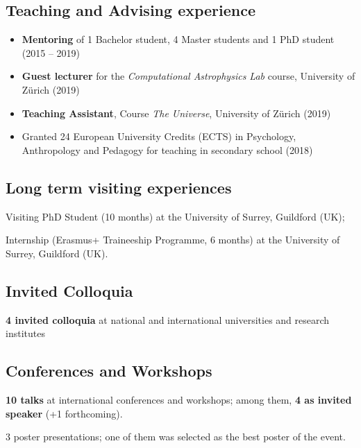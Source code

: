 \subsection*{{Teaching and Advising experience}}
\begin{itemize}[leftmargin=3.5mm]
\setlength\itemsep{-2pt}
\item
\textbf{Mentoring} of 1 Bachelor student, 4 Master students and 1 PhD student (2015 -- 2019)
\item \textbf{Guest lecturer} for the  \textit{Computational Astrophysics Lab} course, University of Z\"urich (2019)
\item
\textbf{Teaching Assistant}, Course \textit{The Universe}, University of Z\"urich (2019)
\item Granted 24 European University Credits (ECTS)  in Psychology, Anthropology and
Pedagogy for teaching in secondary school (2018)
\end{itemize}


\subsection*{{Long term visiting experiences}}
\begin{description}
\setlength\itemsep{-2pt}
\item[\normalfont 2017:] {Visiting PhD Student} (10 months) at the {University of Surrey}, Guildford (UK);
\item[\normalfont 2015:] {Internship} (Erasmus+ Traineeship Programme, 6 months) at the {University of Surrey}, Guildford (UK).
\end{description}

\subsection*{{Invited Colloquia}}
\begin{description}
\setlength\itemsep{-2pt}
\item[\normalfont 2017 -- 2019:] \textbf{4 invited colloquia} at national and international universities and research institutes
\end{description}


\subsection*{Conferences and Workshops}
\begin{description}
\setlength\itemsep{-2pt}
\item \textbf{10 talks} at international conferences and workshops; among them, \textbf{4 as invited speaker} (+1 forthcoming).
\item 3 poster presentations; one of them was selected as the best poster of the event.
\end{description}


